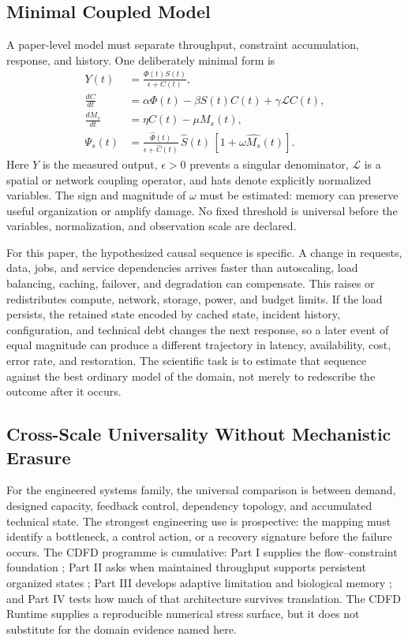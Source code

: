 \documentclass[11pt,a4paper]{article}
\begin{document}
\subsection{Minimal Coupled Model}

A paper-level model must separate throughput, constraint accumulation, response,
and history. One deliberately minimal form is
\begin{align}
Y(t) &= \frac{\Phi(t)S(t)}{\epsilon + C(t)}, \\
\frac{dC}{dt} &= \alpha \Phi(t) - \beta S(t)C(t) + \gamma \mathcal{L}C(t), \\
\frac{dM_s}{dt} &= \eta C(t) - \mu M_s(t), \\
\Psi_s(t) &= \frac{\widehat{\Phi}(t)}{\epsilon+\widehat{C}(t)}\,
             \widehat{S}(t)\,[1+\omega\widehat{M_s}(t)] .
\end{align}
Here $Y$ is the measured output, $\epsilon>0$ prevents a singular denominator,
$\mathcal{L}$ is a spatial or network coupling operator, and hats denote
explicitly normalized variables. The sign and magnitude of $\omega$ must be
estimated: memory can preserve useful organization or amplify damage. No fixed
threshold is universal before the variables, normalization, and observation
scale are declared.

For this paper, the hypothesized causal sequence is specific. A change in
requests, data, jobs, and service dependencies arrives faster than autoscaling, load balancing, caching, failover, and degradation can compensate.
This raises or redistributes compute, network, storage, power, and budget limits. If the load persists,
the retained state encoded by cached state, incident history, configuration, and technical debt changes the next response, so a later event of equal
magnitude can produce a different trajectory in latency, availability, cost, error rate, and restoration. The
scientific task is to estimate that sequence against the best ordinary model of
the domain, not merely to redescribe the outcome after it occurs.

\subsection{Cross-Scale Universality Without Mechanistic Erasure}

For the engineered systems family, the universal comparison is between demand, designed capacity, feedback control, dependency topology, and accumulated technical state. The strongest engineering use is prospective: the mapping must identify a bottleneck, a control action, or a recovery signature before the failure occurs. \cite{BarabasiAlbert1999,WattsStrogatz1998,Shannon1948,BakTangWiesenfeld1987}
The CDFD programme is cumulative: Part I supplies the flow--constraint
foundation \cite{MujjabiPartI2026}; Part II asks when maintained throughput
supports persistent organized states \cite{MujjabiPartII2026}; Part III
develops adaptive limitation and biological memory \cite{MujjabiPartIII2026};
and Part IV \cite{MujjabiPartIV2026} tests how much of that architecture
survives translation. The CDFD Runtime \cite{CDFDRuntime2026} supplies a
reproducible numerical stress surface, but it does not substitute for the
domain evidence named here.
\end{document}
